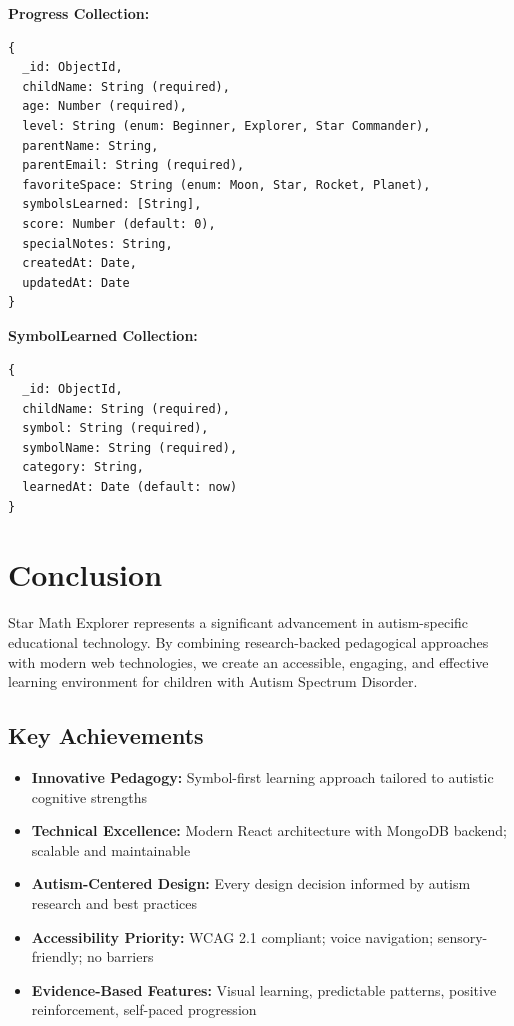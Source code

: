 \documentclass[12pt, a4paper]{article}
\begin{document}
\begin{tcolorbox}[colback=electricblue!5, colframe=electricblue, title=\textbf{MongoDB Collections Schema}]

\textbf{Progress Collection:}
\begin{verbatim}
{
  _id: ObjectId,
  childName: String (required),
  age: Number (required),
  level: String (enum: Beginner, Explorer, Star Commander),
  parentName: String,
  parentEmail: String (required),
  favoriteSpace: String (enum: Moon, Star, Rocket, Planet),
  symbolsLearned: [String],
  score: Number (default: 0),
  specialNotes: String,
  createdAt: Date,
  updatedAt: Date
}
\end{verbatim}

\textbf{SymbolLearned Collection:}
\begin{verbatim}
{
  _id: ObjectId,
  childName: String (required),
  symbol: String (required),
  symbolName: String (required),
  category: String,
  learnedAt: Date (default: now)
}
\end{verbatim}

\end{tcolorbox}

\section{Conclusion}

Star Math Explorer represents a significant advancement in autism-specific educational technology. By combining research-backed pedagogical approaches with modern web technologies, we create an accessible, engaging, and effective learning environment for children with Autism Spectrum Disorder.

\subsection{Key Achievements}

\begin{itemize}[leftmargin=*, itemsep=8pt]
    \item \textbf{Innovative Pedagogy:} Symbol-first learning approach tailored to autistic cognitive strengths
    \item \textbf{Technical Excellence:} Modern React architecture with MongoDB backend; scalable and maintainable
    \item \textbf{Autism-Centered Design:} Every design decision informed by autism research and best practices
    \item \textbf{Accessibility Priority:} WCAG 2.1 compliant; voice navigation; sensory-friendly; no barriers
    \item \textbf{Evidence-Based Features:} Visual learning, predictable patterns, positive reinforcement, self-paced progression
\end{itemize}
\end{document}
